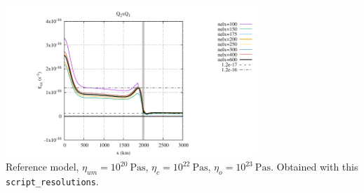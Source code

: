 \begin{center}
\includegraphics[width=9.5cm]{python_codes/fieldstone_143/results/resolutions/fig_resolutions}\\
{\captionfont 
Reference model, $\eta_{um}=10^{20}~\si{\pascal\second}$, 
$\eta_c=10^{22}~\si{\pascal\second}$, $\eta_o=10^{23}~\si{\pascal\second}$. 
Obtained with this  {\tt script\_resolutions}.}
\end{center}

\newpage

